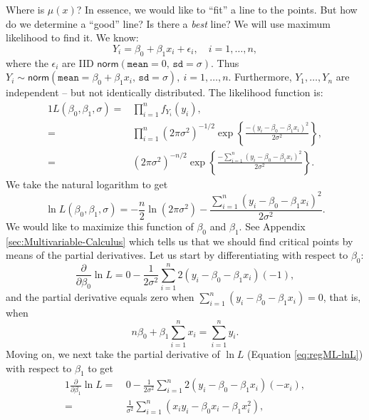 \documentclass[captions=tableheading]{scrbook}
\begin{document}
Where is \( \mu(x) \)? In essence, we would like to ``fit'' a line to the points. But how do we determine a ``good'' line? Is there a \emph{best} line? We will use maximum likelihood to find it. We know:
\begin{equation}
Y_{i} = \beta_{0} + \beta_{1}x_{i} + \epsilon_{i},\quad i=1,\ldots,n,
\end{equation}
where the \( \epsilon_{i} \) are IID \(\mathsf{norm}(\mathtt{mean}=0,\,\mathtt{sd}=\sigma) \). Thus \( Y_{i}\sim\mathsf{norm}(\mathtt{mean}=\beta_{0}+\beta_{1}x_{i},\,\mathtt{sd}=\sigma),\ i=1,\ldots,n \). Furthermore, \( Y_{1},\ldots,Y_{n} \) are independent -- but not identically distributed. The likelihood function is:
\begin{alignat}{1}
L(\beta_{0},\beta_{1},\sigma)= & \prod_{i=1}^{n}f_{Y_{i}}(y_{i}),\\
= & \prod_{i=1}^{n}(2\pi\sigma^{2})^{-1/2}\exp\left\{ \frac{-(y_{i}-\beta_{0}-\beta_{1}x_{i})^{2}}{2\sigma^{2}}\right\} ,\\
= & (2\pi\sigma^{2})^{-n/2}\exp\left\{ \frac{-\sum_{i=1}^{n}(y_{i}-\beta_{0}-\beta_{1}x_{i})^{2}}{2\sigma^{2}}\right\} .
\end{alignat}
We take the natural logarithm to get
\begin{equation}
\ln L(\beta_{0},\beta_{1},\sigma)=-\frac{n}{2}\ln(2\pi\sigma^{2})-\frac{\sum_{i=1}^{n}(y_{i}-\beta_{0}-\beta_{1}x_{i})^{2}}{2\sigma^{2}}.\label{eq:regML-lnL}
\end{equation}
 We would like to maximize this function of \( \beta_{0} \) and \( \beta_{1} \). See Appendix \ref{sec:Multivariable-Calculus} which tells us that we should find critical points by means of the partial derivatives. Let us start by differentiating with respect to \( \beta_{0} \):
\begin{equation}
\frac{\partial}{\partial\beta_{0}}\ln L=0-\frac{1}{2\sigma^{2}}\sum_{i=1}^{n}2(y_{i}-\beta_{0}-\beta_{1}x_{i})(-1),
\end{equation}
and the partial derivative equals zero when \( \sum_{i=1}^{n}(y_{i}-\beta_{0}-\beta_{1}x_{i}) = 0 \), that is, when
\begin{equation}
n \beta_{0} + \beta_{1} \sum_{i=1}^{n} x_{i} = \sum_{i = 1}^{n}y_{i}.\label{eq:regML-a}
\end{equation}
Moving on, we next take the partial derivative of \( \ln L \) (Equation \ref{eq:regML-lnL}) with respect to \( \beta_{1} \) to get
\begin{alignat}{1}
\frac{\partial}{\partial\beta_{1}}\ln L=\  & 0-\frac{1}{2\sigma^{2}}\sum_{i=1}^{n}2(y_{i}-\beta_{0}-\beta_{1}x_{i})(-x_{i}),\\
= & \frac{1}{\sigma^{2}}\sum_{i=1}^{n}\left(x_{i}y_{i}-\beta_{0}x_{i}-\beta_{1}x_{i}^{2}\right),
\end{alignat}
\end{document}
